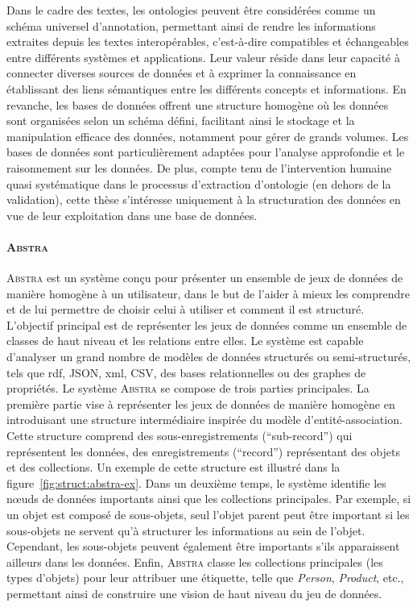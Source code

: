 Dans le cadre des textes, les ontologies peuvent être considérées comme un schéma universel d'annotation, permettant ainsi de rendre les informations extraites depuis les textes interopérables, c'est-à-dire compatibles et échangeables entre différents systèmes et applications.
Leur valeur réside dans leur capacité à connecter diverses sources de données et à exprimer la connaissance en établissant des liens sémantiques entre les différents concepts et informations.
En revanche, les bases de données offrent une structure homogène où les données sont organisées selon un schéma défini, facilitant ainsi le stockage et la manipulation efficace des données, notamment pour gérer de grands volumes.
Les bases de données sont particulièrement adaptées pour l'analyse approfondie et le raisonnement sur les données.
De plus, compte tenu de l'intervention humaine quasi systématique dans le processus d'extraction d'ontologie (en dehors de la validation), cette thèse s'intéresse uniquement à la structuration des données en vue de leur exploitation dans une base de données.

\paragraph{\textsc{Abstra}}
\textsc{Abstra} \cite{barretAbstraGenericAbstractions2022} est un système conçu pour présenter un ensemble de jeux de données de manière homogène à un utilisateur, dans le but de l'aider à mieux les comprendre et de lui permettre de choisir celui à utiliser et comment il est structuré.
L'objectif principal est de représenter les jeux de données comme un ensemble de classes de haut niveau et les relations entre elles.
Le système est capable d'analyser un grand nombre de modèles de données structurés ou semi-structurés, tels que \acrshort{rdf}, JSON, \gls{xml}, CSV, des bases relationnelles ou des graphes de propriétés.
Le système \textsc{Abstra} se compose de trois parties principales.
La première partie vise à représenter les jeux de données de manière homogène en introduisant une structure intermédiaire inspirée du modèle d'entité-association.
Cette structure comprend des sous-enregistrements (\enquote{sub-record}) qui représentent les données, des enregistrements (\enquote{record}) représentant des objets et des collections.
Un exemple de cette structure est illustré dans la figure~\ref{fig:struct:abstra-ex}.
Dans un deuxième temps, le système identifie les nœuds de données importants ainsi que les collections principales.
Par exemple, si un objet est composé de sous-objets, seul l'objet parent peut être important si les sous-objets ne servent qu'à structurer les informations au sein de l'objet.
Cependant, les sous-objets peuvent également être importants s'ils apparaissent ailleurs dans les données.
Enfin, \textsc{Abstra} classe les collections principales (les types d'objets) pour leur attribuer une étiquette, telle que \emph{Person}, \emph{Product}, etc., permettant ainsi de construire une vision de haut niveau du jeu de données.

